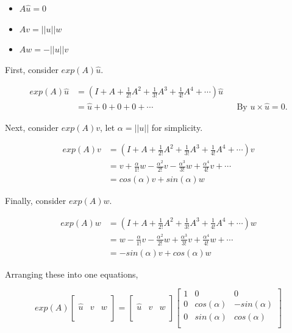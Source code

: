\documentclass[a4paper]{article}
\begin{document}
\begin{itemize}
        \item $A \hat u = 0$
        \item $A v = ||u|| w$
        \item $A w = -||u|| v$
\end{itemize}

First, consider $exp(A) \hat u$.

\begin{align*}
    exp(A) \hat u &= (I + A + \frac{1}{2!} A^2 + \frac{1}{3!} A^3 + \frac{1}{4!} A^4 + \cdots) \hat u \\
                  &= \hat u + 0 + 0 + 0 + \cdots && \text{By } u \times \hat u = 0.
\end{align*}

Next, consider $exp(A) v$, let $\alpha = ||u||$ for simplicity.

\begin{align*}
    exp(A) v &= (I + A + \frac{1}{2!} A^2 + \frac{1}{3!} A^3 + \frac{1}{4!} A^4 + \cdots) v \\
             &= v + \frac{\alpha}{1!} w - \frac{\alpha^2}{2!} v - \frac{\alpha^3}{3!} w + \frac{\alpha^4}{4!} v + \cdots \\
             &= cos(\alpha) v + sin(\alpha) w
\end{align*}

Finally, consider $exp(A) w$.

\begin{align*}
    exp(A) w &= (I + A + \frac{1}{2!} A^2 + \frac{1}{3!} A^3 + \frac{1}{4!} A^4 + \cdots) w \\
             &= w - \frac{\alpha}{1!} v - \frac{\alpha^2}{2!} w + \frac{\alpha^3}{3!} v + \frac{\alpha^4}{4!} w + \cdots \\
             &= -sin(\alpha) v + cos(\alpha) w
\end{align*}

Arranging these into one equations,

\[
    exp(A) \begin{bmatrix}
            \\
            \hat u & v & w \\
            \\
        \end{bmatrix} = \begin{bmatrix}
            \\
            \hat u & v & w \\
            \\
        \end{bmatrix}
        \begin{bmatrix}
            1 & 0 & 0 \\
            0 & cos(\alpha) & -sin(\alpha) \\
            0 & sin(\alpha) & cos(\alpha) \\
        \end{bmatrix}
\]
\end{document}
